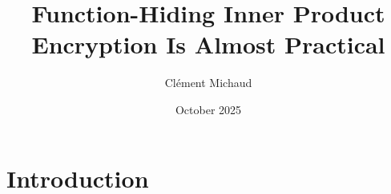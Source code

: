 \documentclass{article}
\title{Function-Hiding Inner Product Encryption Is Almost Practical}
\author{Clément Michaud}
\date{October 2025}
\begin{document}
\maketitle

\section{Introduction}
\end{document}
